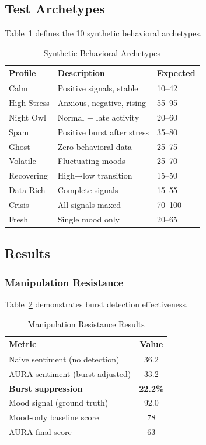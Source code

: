 \documentclass[journal]{IEEEtran}
\begin{document}
\subsection{Test Archetypes}

Table~\ref{tab:archetypes} defines the 10 synthetic behavioral archetypes.

\begin{table}[htbp]
\caption{Synthetic Behavioral Archetypes}
\label{tab:archetypes}
\centering
\begin{tabular}{lll}
\toprule
\textbf{Profile} & \textbf{Description} & \textbf{Expected} \\
\midrule
Calm & Positive signals, stable & 10--42 \\
High Stress & Anxious, negative, rising & 55--95 \\
Night Owl & Normal + late activity & 20--60 \\
Spam & Positive burst after stress & 35--80 \\
Ghost & Zero behavioral data & 25--75 \\
Volatile & Fluctuating moods & 25--70 \\
Recovering & High→low transition & 15--50 \\
Data Rich & Complete signals & 15--55 \\
Crisis & All signals maxed & 70--100 \\
Fresh & Single mood only & 20--65 \\
\bottomrule
\end{tabular}
\end{table}

\subsection{Results}

\subsubsection{Manipulation Resistance}

Table~\ref{tab:manipulation} demonstrates burst detection effectiveness.

\begin{table}[htbp]
\caption{Manipulation Resistance Results}
\label{tab:manipulation}
\centering
\begin{tabular}{lc}
\toprule
\textbf{Metric} & \textbf{Value} \\
\midrule
Naive sentiment (no detection) & 36.2 \\
AURA sentiment (burst-adjusted) & 33.2 \\
\textbf{Burst suppression} & \textbf{22.2\%} \\
\midrule
Mood signal (ground truth) & 92.0 \\
Mood-only baseline score & 78 \\
AURA final score & 63 \\
\bottomrule
\end{tabular}
\end{table}
\end{document}
